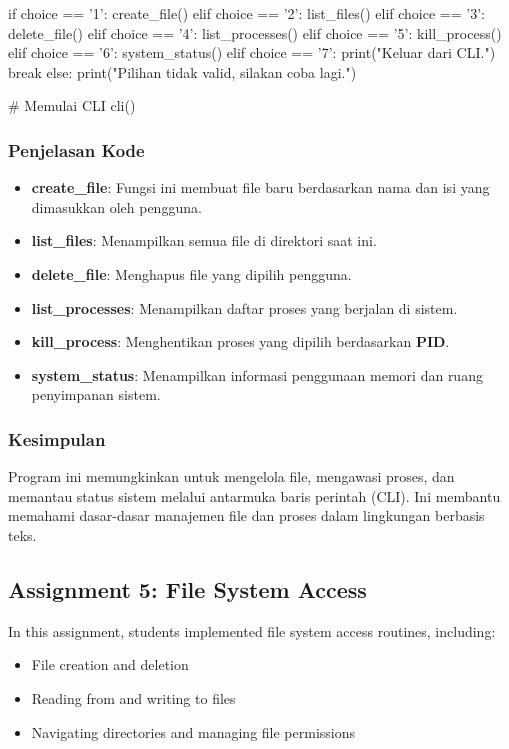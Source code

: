 \documentclass[12pt]{article}
\begin{document}
\begin{python}
            if choice == '1':
                create_file()
            elif choice == '2':
                list_files()
            elif choice == '3':
                delete_file()
            elif choice == '4':
                list_processes()
            elif choice == '5':
                kill_process()
            elif choice == '6':
                system_status()
            elif choice == '7':
                print("Keluar dari CLI.")
                break
            else:
                print("Pilihan tidak valid, silakan coba lagi.")
    
    # Memulai CLI
    cli()
\end{python}


\subsubsection{\textbf{Penjelasan Kode}}

\begin{itemize}
    \item \textbf{create\_file}: Fungsi ini membuat file baru berdasarkan nama dan isi yang dimasukkan oleh pengguna.
    \item \textbf{list\_files}: Menampilkan semua file di direktori saat ini.
    \item \textbf{delete\_file}: Menghapus file yang dipilih pengguna.
    \item \textbf{list\_processes}: Menampilkan daftar proses yang berjalan di sistem.
    \item \textbf{kill\_process}: Menghentikan proses yang dipilih berdasarkan \textbf{PID}.
    \item \textbf{system\_status}: Menampilkan informasi penggunaan memori dan ruang penyimpanan sistem.
\end{itemize}

\subsubsection{Kesimpulan}

Program ini memungkinkan  untuk mengelola file, mengawasi proses, dan memantau status sistem melalui antarmuka baris perintah (CLI). Ini membantu memahami dasar-dasar manajemen file dan proses dalam lingkungan berbasis teks.

 
\subsection{Assignment 5: File System Access}
In this assignment, students implemented file system access routines, including:
\begin{itemize}
    \item File creation and deletion
    \item Reading from and writing to files
    \item Navigating directories and managing file permissions
\end{itemize}
\end{document}
